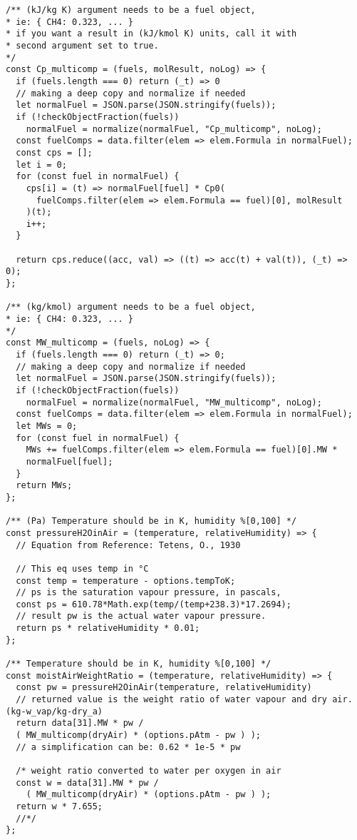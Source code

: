 \begin{verbatim}
/** (kJ/kg K) argument needs to be a fuel object,
* ie: { CH4: 0.323, ... }
* if you want a result in (kJ/kmol K) units, call it with 
* second argument set to true.
*/
const Cp_multicomp = (fuels, molResult, noLog) => {
  if (fuels.length === 0) return (_t) => 0
  // making a deep copy and normalize if needed
  let normalFuel = JSON.parse(JSON.stringify(fuels));
  if (!checkObjectFraction(fuels)) 
    normalFuel = normalize(normalFuel, "Cp_multicomp", noLog);
  const fuelComps = data.filter(elem => elem.Formula in normalFuel);
  const cps = [];
  let i = 0;
  for (const fuel in normalFuel) {
    cps[i] = (t) => normalFuel[fuel] * Cp0(
      fuelComps.filter(elem => elem.Formula == fuel)[0], molResult
    )(t);
    i++;
  }
  
  return cps.reduce((acc, val) => ((t) => acc(t) + val(t)), (_t) => 0);
};

/** (kg/kmol) argument needs to be a fuel object,
* ie: { CH4: 0.323, ... }
*/
const MW_multicomp = (fuels, noLog) => {
  if (fuels.length === 0) return (_t) => 0;
  // making a deep copy and normalize if needed
  let normalFuel = JSON.parse(JSON.stringify(fuels));
  if (!checkObjectFraction(fuels)) 
    normalFuel = normalize(normalFuel, "MW_multicomp", noLog);
  const fuelComps = data.filter(elem => elem.Formula in normalFuel);
  let MWs = 0;
  for (const fuel in normalFuel) {
    MWs += fuelComps.filter(elem => elem.Formula == fuel)[0].MW * 
    normalFuel[fuel];
  }
  return MWs;
};

/** (Pa) Temperature should be in K, humidity %[0,100] */
const pressureH2OinAir = (temperature, relativeHumidity) => {
  // Equation from Reference: Tetens, O., 1930

  // This eq uses temp in °C
  const temp = temperature - options.tempToK;
  // ps is the saturation vapour pressure, in pascals,
  const ps = 610.78*Math.exp(temp/(temp+238.3)*17.2694);
  // result pw is the actual water vapour pressure.
  return ps * relativeHumidity * 0.01;
};

/** Temperature should be in K, humidity %[0,100] */
const moistAirWeightRatio = (temperature, relativeHumidity) => {
  const pw = pressureH2OinAir(temperature, relativeHumidity)
  // returned value is the weight ratio of water vapour and dry air. (kg-w_vap/kg-dry_a)
  return data[31].MW * pw / 
  ( MW_multicomp(dryAir) * (options.pAtm - pw ) );
  // a simplification can be: 0.62 * 1e-5 * pw
  
  /* weight ratio converted to water per oxygen in air
  const w = data[31].MW * pw / 
    ( MW_multicomp(dryAir) * (options.pAtm - pw ) );
  return w * 7.655;
  //*/
};


\end{verbatim}
